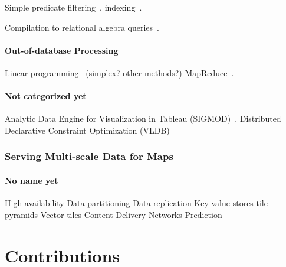 \documentclass[11pt, oneside]{report}
\begin{document}
Simple predicate filtering~\cite{vizzuality2012cartodb}, indexing~\cite{nutanong2012multiresolution, van1995gap}.

Compilation to relational algebra queries~\cite{wu2014case, battle2013scalar, boncz2006monetdb, grust2009ferry}.

\subsection{Out-of-database Processing}

Linear programming~\cite{haunert2006landcover, sarma2012fusiontables} (simplex? other methods?)
MapReduce~\cite{aji2013hadoopgis}.

\subsection{Not categorized yet}

Analytic Data Engine for Visualization in Tableau (SIGMOD)~\cite{wesley2011tableau}.
Distributed Declarative Constraint Optimization (VLDB)~\cite{liu2012cologne}




\section{Serving Multi-scale Data for Maps}
\label{related:work:serving}


\subsection{No name yet}
High-availability
Data partitioning
Data replication
Key-value stores
tile pyramids
Vector tiles
Content Delivery Networks
Prediction






\part{Contributions}
\end{document}
